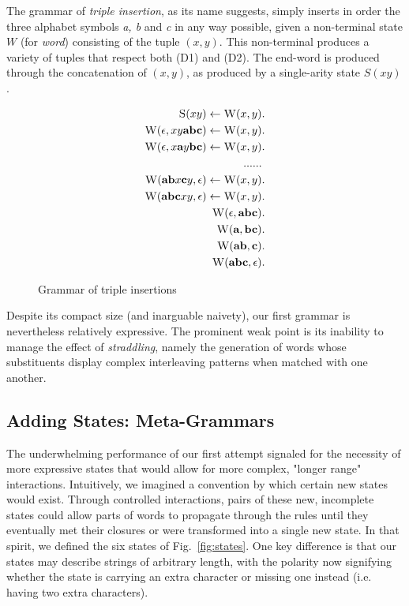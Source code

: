 \documentclass[nonatbib,numbers,10pt]{sigplanconf}
\newcommand\s{\textsc}
\begin{document}
The grammar of \textit{triple insertion}, as its name suggests, simply inserts in order the three alphabet symbols \textit{a, b} and \textit{c} in any way possible, given a non-terminal state $W$ (for \textit{word}) consisting of the tuple $(x,y)$. This non-terminal produces a variety of tuples that respect both (D1) and (D2). The end-word is produced through the concatenation of $(x,y)$, as produced by a single-arity state $S(xy)$.
\begin{figure}[h!]
\begin{align}
\setcounter{equation}{0}
\s{S}(xy) \leftarrow \s{W}(x,y)&. \\
\s{W}(\epsilon, xy\textbf{abc}) \leftarrow \s{W}(x,y)&. \\
\s{W}(\epsilon, x\textbf{a}y\textbf{bc}) \leftarrow \s{W}(x,y)&. \\
...... \nonumber \\
\setcounter{equation}{59}
\s{W}(\textbf{ab}x\textbf{c}y, \epsilon) \leftarrow \s{W}(x,y)&. \\
\s{W}(\textbf{abc}xy, \epsilon) \leftarrow \s{W}(x,y)&. \\
\s{W}(\epsilon, \textbf{abc})&. \\
\s{W}(\textbf{a}, \textbf{bc})&. \\
\s{W}(\textbf{ab}, \textbf{c})&. \\
\s{W}(\textbf{abc}, \epsilon)&.
\end{align}
\caption{Grammar of triple insertions}
\end{figure}

Despite its compact size (and inarguable naivety), our first grammar is nevertheless relatively expressive. The prominent weak point is its inability to manage the effect of \textit{straddling}, namely the generation of words whose substituents display complex interleaving patterns when matched with one another.
\subsection{Adding States: Meta-Grammars}
The underwhelming performance of our first attempt signaled for the necessity of more expressive states that would allow for more complex, "longer range" interactions. Intuitively, we imagined a convention by which certain new states would exist. Through controlled interactions, pairs of these new, incomplete states could allow parts of words to propagate through the rules until they eventually met their closures or were transformed into a single new state. In that spirit, we defined the six states of Fig.~\ref{fig:states}. One key difference is that our states may describe strings of arbitrary length, with the polarity now signifying whether the state is carrying an extra character or missing one instead (i.e. having two extra characters).
\end{document}

